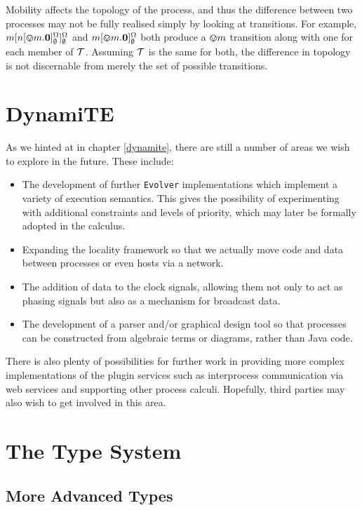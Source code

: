 Mobility affects the topology of the process, and thus the difference
between two processes may not be fully realised simply by looking at
transitions.  For example,
${m}[ {n}[ \varovee m.\textbf{0} ]^{\Omega}_{\emptyset} ]^{\Omega}_{\emptyset}$
and ${m}[ \varovee m.\textbf{0} ]^{\Omega}_{\emptyset}$ both produce a
$\varovee m$ transition along with one for each member of $\text{$\mathcal{T}$}$.
Assuming $\text{$\mathcal{T}$}$ is the same for both, the difference in topology is
not discernable from merely the set of possible transitions.

\section{DynamiTE}
\label{future:dynamite}

As we hinted at in chapter \ref{dynamite}, there are still a number of
areas we wish to explore in the future.  These include:

\begin{itemize}
\item The development of further \texttt{Evolver} implementations
  which implement a variety of execution semantics.  This gives the
  possibility of experimenting with additional constraints and levels
  of priority, which may later be formally adopted in the calculus.
\item Expanding the locality framework so that we actually move code
  and data between processes or even hosts via a network.
\item The addition of data to the clock signals, allowing them not
  only to act as phasing signals but also as a mechanism for broadcast
  data.
\item The development of a parser and/or graphical design tool so that
  processes can be constructed from algebraic terms or diagrams,
  rather than Java code.
\end{itemize}

There is also plenty of possibilities for further work in providing
more complex implementations of the plugin services such as
interprocess communication via web services and supporting other
process calculi.  Hopefully, third parties may also wish to get
involved in this area.

\section{The Type System}
\label{future:types}

\subsection{More Advanced Types}

